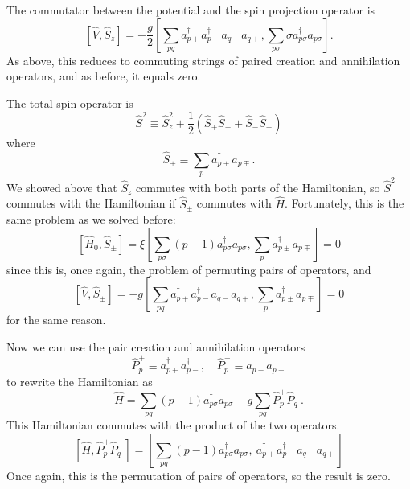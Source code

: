 \documentclass{article}
\begin{document}
	The commutator between the potential and the spin projection operator is
	\begin{equation*}
		\left[ \hat V, \hat S_z \right] = -\frac{g}{2} \left[ \sum_{pq} a^\dagger_{p+} a^\dagger_{p-} a_{q-} a_{q+}, \sum_{p\sigma} \sigma a^\dagger_{p\sigma} a_{p\sigma} \right].
	\end{equation*}
	As above, this reduces to commuting strings of paired creation and annihilation operators, and as before, it equals zero.

	The total spin operator is
	\begin{equation}
		\hat S^2 \equiv \hat S_z^2 + \frac{1}{2} \left( \hat S_+ \hat S_- + \hat S_- \hat S_+ \right)
	\end{equation}
	where
	\begin{equation*}
		\hat S_\pm \equiv \sum_p a^\dagger_{p\pm} a_{p\mp}.
	\end{equation*}
	We showed above that $\hat S_z$ commutes with both parts of the Hamiltonian, so $\hat S^2$ commutes with the Hamiltonian if $\hat S_\pm$ commutes with $\hat H$. Fortunately, this is the same problem as we solved before:
	\begin{equation*}
		\left[ \hat H_0, \hat S_\pm \right] = \xi \left[ \sum_{p\sigma} (p-1) a_{p\sigma}^\dagger a_{p\sigma}, \sum_p a^\dagger_{p\pm} a_{p\mp} \right] = 0
	\end{equation*}
	since this is, once again, the problem of permuting pairs of operators, and
	\begin{equation*}
		\left[ \hat V, \hat S_\pm \right] = -g \left[ \sum_{pq} a^\dagger_{p+} a^\dagger_{p-} a_{q-} a_{q+}, \sum_p a^\dagger_{p\pm} a_{p\mp} \right] = 0
	\end{equation*}
	for the same reason.

	Now we can use the pair creation and annihilation operators
	\begin{equation*}
		\hat P_p^+ \equiv a^\dagger_{p+} a^\dagger_{p-}, \quad \hat P_p^- \equiv a_{p-} a_{p+}
	\end{equation*}
	to rewrite the Hamiltonian as
	\begin{equation}
		\hat H = \sum_{pq} (p-1) a^\dagger_{p\sigma} a_{p\sigma} - g \sum_{pq} \hat P_p^+ \hat P_q^-.
	\end{equation}
	This Hamiltonian commutes with the product of the two operators.
	\begin{equation*}
		\left[ \hat H, \hat P_p^+ \hat P_q^- \right] = \left[ \sum_{pq} (p-1) a^\dagger_{p\sigma} a_{p\sigma},\ a^\dagger_{p+} a^\dagger_{p-} a_{q-} a_{q+} \right]
	\end{equation*}
	Once again, this is the permutation of pairs of operators, so the result is zero.
\end{document}
